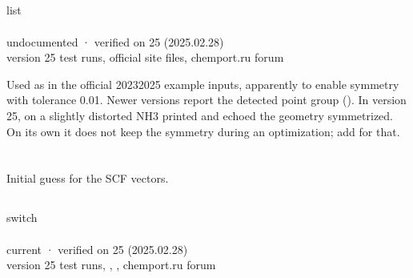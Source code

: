 \documentclass[letterpaper,10pt,english,openany,oneside]{sphinxmanual}
\begin{document}
\subsection{}
\label{\detokenize{reference/molecule:sym}}\label{\detokenize{reference/molecule:molecule-sym}}
\ignorespaces 
\sphinxAtStartPar
{} list\\
 \\
 undocumented · verified on 25 (2025.02.28)\\
 version 25 test runs, official site files, chemport.ru forum

\sphinxAtStartPar
Used as  in the official 2023\textendash{}2025 example inputs, apparently to enable symmetry with tolerance 0.01.
Newer versions report the detected point group (). In version 25,  on a slightly
distorted NH3 printed  and echoed the geometry symmetrized. On its own it
does not keep the symmetry during an optimization; add  for that.

\sphinxAtStartPar
{} {\hyperref[\detokenize{reference/optimize:optimize-symmetry}]{}}

\sphinxstepscope




\section{}
\label{\detokenize{reference/guess:guess}}\label{\detokenize{reference/guess:group-guess}}\label{\detokenize{reference/guess::doc}}
\ignorespaces 
\sphinxAtStartPar
Initial guess for the SCF vectors.


\subsection{}
\label{\detokenize{reference/guess:read}}\label{\detokenize{reference/guess:guess-read}}
\ignorespaces 
\sphinxAtStartPar
{} switch\\
 \\
 current · verified on 25 (2025.02.28)\\
 version 25 test runs, , , chemport.ru forum
\end{document}
